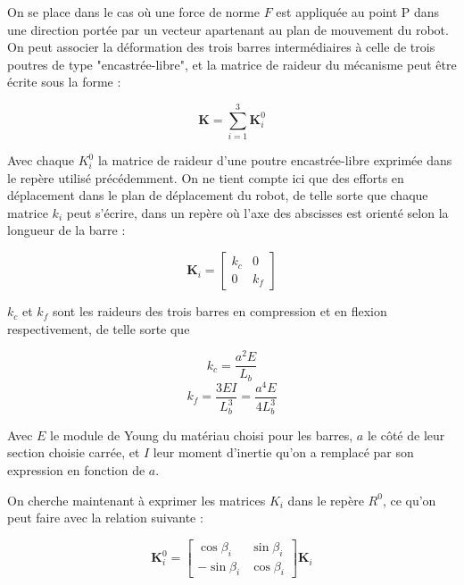 \documentclass{article}
\begin{document}
\begin{multicols*}{2}
On se place dans le cas où une force de norme $F$ est appliquée au point P dans une direction portée par un vecteur apartenant au plan de mouvement du robot. On peut associer la déformation des trois barres intermédiaires à celle de trois poutres de type "encastrée-libre", et la matrice de raideur du mécanisme peut être écrite sous la forme :

\begin{equation}
    \mathbf{K} = \sum_{i=1}^{3} \mathbf{K}_i^0
\end{equation}

Avec chaque $K_i^0$ la matrice de raideur d'une poutre encastrée-libre exprimée dans le repère utilisé précédemment. On ne tient compte ici que des efforts en déplacement dans le plan de déplacement du robot, de telle sorte que chaque matrice $k_i$ peut s'écrire, dans un repère où l'axe des abscisses est orienté selon la longueur de la barre :

\begin{equation}
    \mathbf{K}_i = \begin{bmatrix}
    k_c & 0\\
    0 & k_f
    \end{bmatrix}
\end{equation}

$k_c$ et $k_f$ sont les raideurs des trois barres en compression et en flexion respectivement, de telle sorte que

\begin{equation*}
    k_c = \frac{a^2 E}{L_b}
\end{equation*}
\begin{equation*}
    k_f = \frac{3EI}{L_b^3} = \frac{a^4 E}{4L_b^3}
\end{equation*}

Avec $E$ le module de Young du matériau choisi pour les barres, $a$ le côté de leur section choisie carrée, et $I$ leur moment d'inertie qu'on a remplacé par son expression en fonction de $a$.

On cherche maintenant à exprimer les matrices $K_i$ dans le repère $R^0$, ce qu'on peut faire avec la relation suivante :

\begin{equation}
    \mathbf{K}_i^0 =  \begin{bmatrix} \cos{\beta_i} & \sin{\beta_i}\\
    -\sin{\beta_i} & \cos{\beta_i}
    \end{bmatrix}\mathbf{K}_i
\end{equation}


\end{multicols*}
\end{document}
